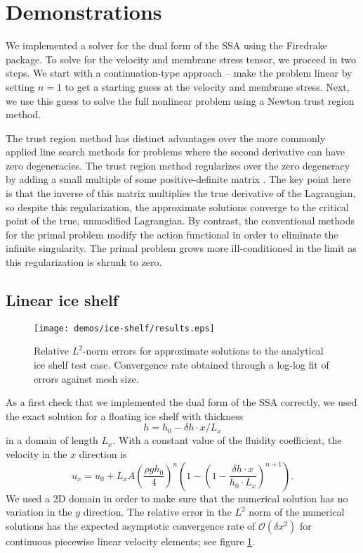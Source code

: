 \documentclass{article}
\theoremstyle{definition}
\theoremstyle{plain}
\begin{document}
\section{Demonstrations}

We implemented a solver for the dual form of the SSA using the Firedrake package.
To solve for the velocity and membrane stress tensor, we proceed in two steps.
We start with a continuation-type approach -- make the problem linear by setting $n = 1$ to get a starting guess at the velocity and membrane stress.
Next, we use this guess to solve the full nonlinear problem using a Newton trust region method.

The trust region method has distinct advantages over the more commonly applied line search methods for problems where the second derivative can have zero degeneracies.
The trust region method regularizes over the zero degeneracy by adding a small multiple of some positive-definite matrix \citep{conn2000trust}.
The key point here is that the inverse of this matrix multiplies the true derivative of the Lagrangian, so despite this regularization, the approximate solutions converge to the critical point of the true, unmodified Lagrangian.
By contrast, the conventional methods for the primal problem modify the action functional in order to eliminate the infinite singularity.
The primal problem grows more ill-conditioned in the limit as this regularization is shrunk to zero.

\subsection{Linear ice shelf}

\begin{figure}[h]
    \begin{center}
        \texttt{[image: demos/ice-shelf/results.eps]}
    \end{center}
    \caption{Relative $L^2$-norm errors for approximate solutions to the analytical ice shelf test case.
    Convergence rate obtained through a log-log fit of errors against mesh size.}
    \label{fig:linear-ice-shelf-convergence-rate}
\end{figure}

As a first check that we implemented the dual form of the SSA correctly, we used the exact solution for a floating ice shelf with thickness
\begin{equation}
    h = h_0 - \delta h \cdot x / L_x
\end{equation}
in a domain of length $L_x$.
With a constant value of the fluidity coefficient, the velocity in the $x$ direction is
\begin{equation}
    u_x = u_0 + L_x A \left(\frac{\rho g h_0}{4}\right)^n\left(1 - \left(1 - \frac{\delta h \cdot x}{h_0\cdot L_x}\right)^{n + 1}\right).
\end{equation}
We used a 2D domain in order to make sure that the numerical solution has no variation in the $y$ direction.
The relative error in the $L^2$ norm of the numerical solutions has the expected asymptotic convergence rate of $\mathscr{O}(\delta x^2)$ for continuous piecewise linear velocity elements; see figure \ref{fig:linear-ice-shelf-convergence-rate}.
\end{document}
